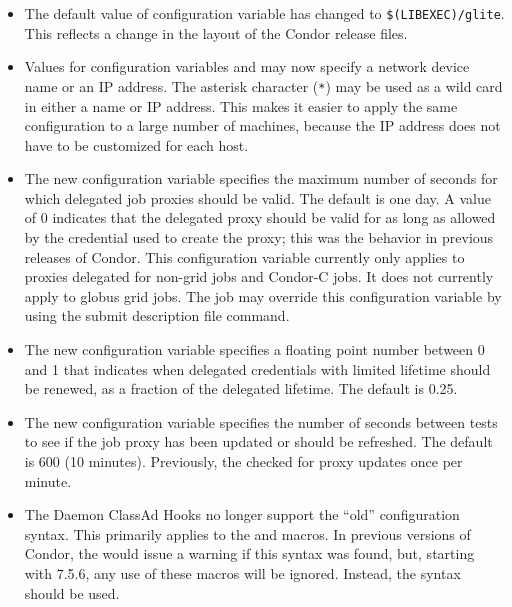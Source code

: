 \begin{itemize}

\item The default value of configuration variable 
  has changed to \verb|$(LIBEXEC)/glite|. This reflects a change in the
  layout of the Condor release files.

\item Values for configuration variables  and
   may now specify a network
  device name or an IP address.  The asterisk character (\verb|*|)
  may be used as a wild card in either a name or IP address.
  This makes it easier to apply the same
  configuration to a large number of machines, because the IP address
  does not have to be customized for each host.

\item The new configuration variable
   specifies the
  maximum number of seconds for which delegated job proxies should be
  valid.  The default is one day.  A value of 0 indicates that the
  delegated proxy should be valid for as long as allowed by the
  credential used to create the proxy; this was the behavior in
  previous releases of Condor.  This configuration variable currently
  only applies to proxies delegated for non-grid jobs and Condor-C
  jobs.  It does not currently apply to globus grid jobs.  The job may
  override this configuration variable by using the
   submit description file
  command.

\item The new configuration variable
   specifies a
    floating point number between 0 and 1 that indicates when
    delegated credentials with limited lifetime should be renewed, as
    a fraction of the delegated lifetime.  The default is 0.25.

\item The new configuration variable
   specifies the number of
  seconds between tests to see if the job proxy has been updated or
  should be refreshed.  The default is 600 (10 minutes).  Previously,
  the  checked for proxy updates once per minute.

\item The Daemon ClassAd Hooks no longer support the ``old''
  configuration syntax.  This primarily applies to the
   and  macros.  In
  previous versions of Condor, the  would issue a
  warning if this syntax was found, but, starting with 7.5.6, any use
  of these macros will be ignored.  Instead, the
   syntax should be used.


\end{itemize}
